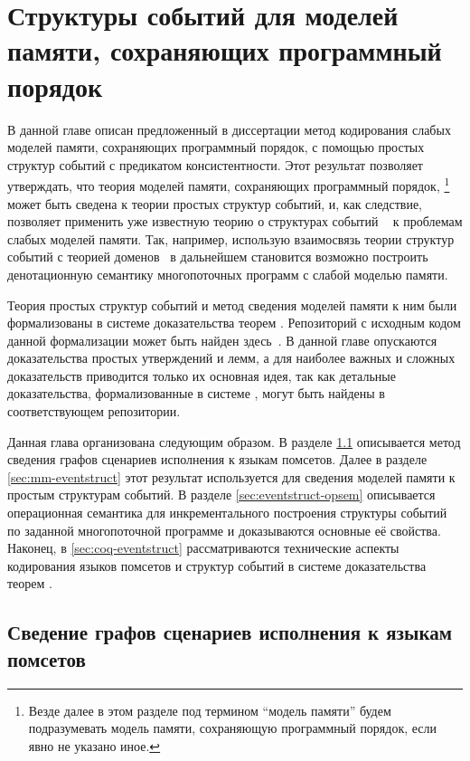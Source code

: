 \chapter{Структуры событий для моделей памяти, сохраняющих программный порядок}
\label{ch:porf-evenstruct}

В данной главе описан предложенный в диссертации метод 
кодирования слабых моделей памяти, сохраняющих программный порядок, 
с помощью простых структур событий с предикатом консистентности. 
Этот результат позволяет утверждать, что теория  
моделей памяти, сохраняющих программный порядок,%
\footnote{Везде далее в этом разделе 
под термином ``модель памяти'' будем подразумевать 
модель памяти, сохраняющую программный порядок, если явно не указано иное.}
может быть сведена к теории простых структур событий, 
и, как следствие, позволяет применить уже известную теорию о структурах событий%
~\cite{Winskel:86,Vaandrager:TCS1991,Sassone:MFCS1993,Nielsen:REX93,Winskel-TCS:09}
к проблемам слабых моделей памяти.
Так, например, использую взаимосвязь теории структур событий с теорией доменов~\cite{Winskel-TCS:09}
в дальнейшем становится возможно построить денотационную семантику 
многопоточных программ с слабой моделью памяти.

Теория простых структур событий и метод сведения 
моделей памяти к ним были формализованы в системе 
доказательства теорем \coq.
Репозиторий с исходным кодом данной формализации
может быть найден здесь~\cite{Coq:EventStruct}.
В данной главе опускаются доказательства
простых утверждений и лемм, а для наиболее
важных и сложных доказательств приводится только их основная идея,
так как детальные доказательства, формализованные в системе \coq,
могут быть найдены в соответствующем репозитории.

Данная глава организована следующим образом. 
В разделе \ref{sec:pomset-graphs} описывается метод 
сведения графов сценариев исполнения к языкам помсетов. 
Далее в разделе \ref{sec:mm-eventstruct} этот результат 
используется для сведения моделей памяти к простым структурам событий. 
В разделе \ref{sec:eventstruct-opsem} описывается 
операционная семантика для инкрементального построения 
структуры событий по заданной многопоточной программе 
и доказываются основные её свойства. 
Наконец, в \ref{sec:coq-eventstruct} рассматриваются 
технические аспекты кодирования языков помсетов и структур событий 
в системе доказательства теорем \coq.

\section{Сведение графов сценариев исполнения к языкам помсетов}
\label{sec:pomset-graphs}

